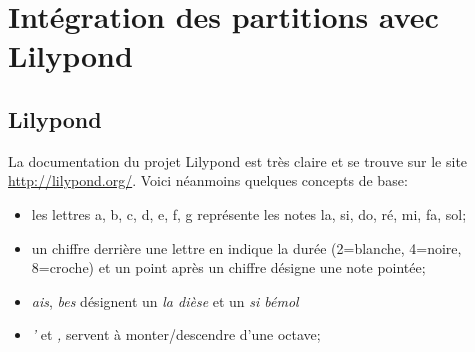 \documentclass[a4paper]{article}
\begin{document}
%
%
%
%
%


\section{Intégration des partitions avec Lilypond}

\subsection{Lilypond}

La documentation du projet Lilypond est très
claire et se trouve sur le site \url{http://lilypond.org/}.
Voici néanmoins quelques concepts de base:

\begin{itemize}
\item les lettres a, b, c, d, e, f, g représente les notes la, si, do,
  ré, mi, fa, sol;
\item un chiffre derrière une lettre en indique la durée (2=blanche, 4=noire,
  8=croche) et un point après un chiffre désigne une note pointée;
\item \emph{ais}, \emph{bes} désignent un \emph{la dièse} et un \emph{si bémol}
\item \emph{'} et \emph{,} servent à monter/descendre d'une octave;
\end{itemize}
\end{document}
